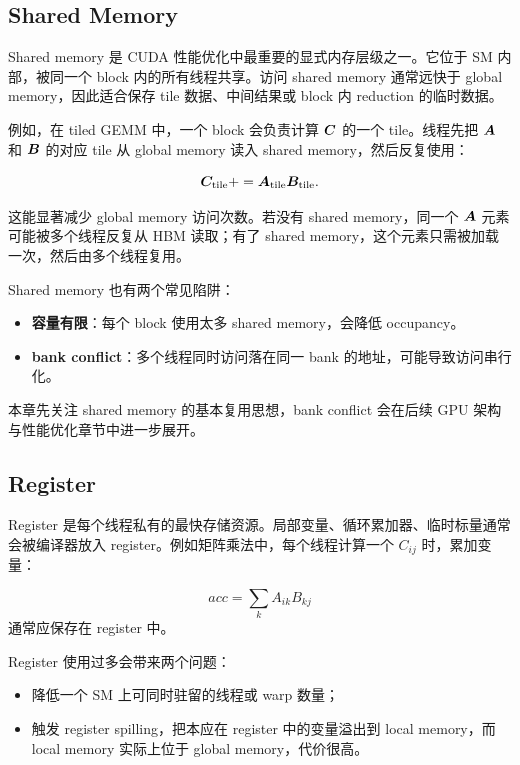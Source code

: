 \subsection{Shared Memory}
\label{subsec:shared-memory}

Shared memory 是 CUDA 性能优化中最重要的显式内存层级之一。它位于 SM 内部，被同一个 block 内的所有线程共享。访问 shared memory 通常远快于 global memory，因此适合保存 tile 数据、中间结果或 block 内 reduction 的临时数据。

例如，在 tiled GEMM 中，一个 block 会负责计算 $\bm{C}$ 的一个 tile。线程先把 $\bm{A}$ 和 $\bm{B}$ 的对应 tile 从 global memory 读入 shared memory，然后反复使用：

\[
  \bm{C}_{\mathrm{tile}}
  +=
  \bm{A}_{\mathrm{tile}}
  \bm{B}_{\mathrm{tile}}.
\]

这能显著减少 global memory 访问次数。若没有 shared memory，同一个 $\bm{A}$ 元素可能被多个线程反复从 HBM 读取；有了 shared memory，这个元素只需被加载一次，然后由多个线程复用。

Shared memory 也有两个常见陷阱：

\begin{itemize}
  \item \textbf{容量有限}：每个 block 使用太多 shared memory，会降低 occupancy。
  \item \textbf{bank conflict}：多个线程同时访问落在同一 bank 的地址，可能导致访问串行化。
\end{itemize}

本章先关注 shared memory 的基本复用思想，bank conflict 会在后续 GPU 架构与性能优化章节中进一步展开。

\subsection{Register}
\label{subsec:register}

Register 是每个线程私有的最快存储资源。局部变量、循环累加器、临时标量通常会被编译器放入 register。例如矩阵乘法中，每个线程计算一个 $C_{ij}$ 时，累加变量：

\[
  acc=\sum_k A_{ik}B_{kj}
\]
通常应保存在 register 中。

Register 使用过多会带来两个问题：

\begin{itemize}
  \item 降低一个 SM 上可同时驻留的线程或 warp 数量；
  \item 触发 register spilling，把本应在 register 中的变量溢出到 local memory，而 local memory 实际上位于 global memory，代价很高。
\end{itemize}


